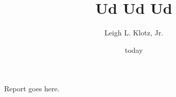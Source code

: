\pagestyle{plain}
\setlength{\parskip}{0.5\baselineskip}
\title{Ud Ud Ud}
\author{Leigh L. Klotz, Jr.}
\date{today}

\maketitle


Report goes here.


